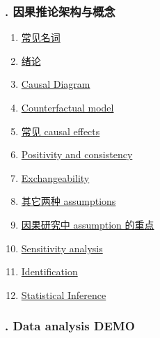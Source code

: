 \documentclass[11pt]{article}
\begin{document}
\vspace{-1cm}

\subsubsection*{. 因果推论架构与概念}

\vspace{-0.5cm}

\begin{multicols}{2}
	\begin{enumerate}
		\item \href{https://mp.weixin.qq.com/s/tBHwHv3gQdgX2lKMJfHpcA}{常见名词}	%
		\item \href{https://mp.weixin.qq.com/s/6F7J_KaNsKEnnQF3M1peJQ}{绪论}	%
		\item \href{https://mp.weixin.qq.com/s/gsIw1zhrvkF2dZnxNKzoEA}{Causal Diagram}	%
		\item \href{https://mp.weixin.qq.com/s/FC3qJ9acrJZbV208v17UTA}{Counterfactual model}	%
		\item \href{https://mp.weixin.qq.com/s/q-xD8pj2bM2RfD67PlEPmA}{常见 causal effects}	%
		\item \href{https://mp.weixin.qq.com/s/yiZLG7CQsUCsek88vNz39A}{Positivity and consistency}	%
		\item \href{https://mp.weixin.qq.com/s/BgCtclwJsd_vJlFuppHiIQ}{Exchangeability}	%
		\item \href{https://mp.weixin.qq.com/s/aeflhUV9ooP80hSoPtd4Ew}{其它两种 assumptions}	%
		\item \href{https://mp.weixin.qq.com/s/tjGhDj2vW7btp9_mpH7fsQ}{因果研究中 assumption 的重点}	%
		\item \href{https://mp.weixin.qq.com/s/ygs4MYKA3s-eZnrO7q6GSA}{Sensitivity analysis}	%
		\item \href{https://mp.weixin.qq.com/s/Lwy0ZgNU9E-m7xtYjEwZYA}{Identification}	%
		\item \href{https://mp.weixin.qq.com/s/6XFNSn2uEQhJVoqj2zfbvQ}{Statistical Inference}	%
	\end{enumerate}
\end{multicols}

\vspace{-1cm}

\subsubsection*{. Data analysis DEMO}

\vspace{-0.5cm}
\end{document}
